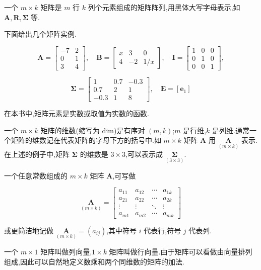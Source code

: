 

 \quad 一个 $m \times k$ 矩阵是 $m$ 行 $k$ 列个元素组成的矩阵阵列,用黑体大写字母表示,如 $\bm{A},\bm{R},\bm{\Sigma}$ 等.

下面给出几个矩阵实例.

\[
\bm{A} = \begin{bmatrix} -7 & 2 \\ 0 & 1 \\ 3 & 4 \end{bmatrix}, \quad
\bm{B} = \begin{bmatrix} x & 3 & 0 \\ 4 & -2 & 1/x \end{bmatrix}, \quad
\bm{I} = \begin{bmatrix} 1 & 0 & 0 \\ 0 & 1 & 0 \\ 0 & 0 & 1 \end{bmatrix},
\]

\[
\bm{\Sigma} = \begin{bmatrix} 1 & 0.7 & -0.3 \\ 0.7 & 2 & 1 \\ -0.3 & 1 & 8 \end{bmatrix}, \quad
\bm{E} = [\bm{e}_1]
\]

在本书中,矩阵元素是实数或取值为实数的函数.

 \quad 一个 $m \times k$ 矩阵的维数(缩写为 dim)是有序对 $(m,k)$;$m$ 是行维,$k$ 是列维.通常一个矩阵的维数记在代表矩阵的字母下方的括号中.如 $m \times k$ 矩阵 $\bm{A}$ 用 $\underset{(m \times k)}{\bm{A}}$ 表示.在上述的例子中,矩阵 $\bm{\Sigma}$ 的维数是 $3 \times 3$,可以表示成 $\underset{(3 \times 3)}{\bm{\Sigma}}$.

一个任意常数组成的 $m \times k$ 矩阵 $\bm{A}$,可写做

\[
\underset{(m \times k)}{\bm{A}} = \begin{bmatrix}
a_{11} & a_{12} & \cdots & a_{1k} \\
a_{21} & a_{22} & \cdots & a_{2k} \\
\vdots & \vdots & \ddots & \vdots \\
a_{m1} & a_{m2} & \cdots & a_{mk}
\end{bmatrix}
\]

或更简洁地记做 $\underset{(m \times k)}{\bm{A}} = (a_{ij})$,其中符号 $i$ 代表行,符号 $j$ 代表列.

一个 $m \times 1$ 矩阵叫做列向量,$1 \times k$ 矩阵叫做行向量.由于矩阵可以看做由向量排列组成,因此可以自然地定义数乘和两个同维数的矩阵的加法.

